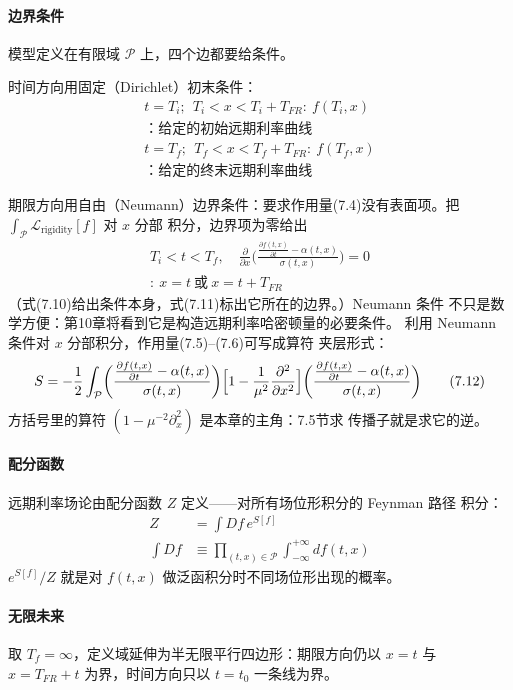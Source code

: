 \paragraph{边界条件}
模型定义在有限域 $\mathcal{P}$ 上，四个边都要给条件。

时间方向用固定（Dirichlet）初末条件：
\begin{gather*}
t=T_i;\ \ T_i<x<T_i+T_{FR}:\ f(T_i,x)\\
\text{：给定的初始远期利率曲线}
\tag{7.8}\\[2pt]
t=T_f;\ \ T_f<x<T_f+T_{FR}:\ f(T_f,x)\\
\text{：给定的终末远期利率曲线}
\tag{7.9}
\end{gather*}

期限方向用自由（Neumann）边界条件：要求作用量(7.4)没有表面项。把
$\int_{\mathcal{P}}\mathcal{L}_{\mathrm{rigidity}}[f]$ 对 $x$ 分部
积分，边界项为零给出
\begin{gather*}
T_i<t<T_f,\quad
\frac{\partial}{\partial x}\biggl(\frac{\frac{\partial f(t,x)}
{\partial t}-\alpha(t,x)}{\sigma(t,x)}\biggr)=0
\tag{7.10}\\
:\ x=t\ \text{或}\ x=t+T_{FR}
\tag{7.11}
\end{gather*}
（式(7.10)给出条件本身，式(7.11)标出它所在的边界。）Neumann 条件
不只是数学方便：第10章将看到它是构造远期利率哈密顿量的必要条件。
利用 Neumann 条件对 $x$ 分部积分，作用量(7.5)--(7.6)可写成算符
夹层形式：
\begin{equation*}
S=-\frac{1}{2}\int_{\mathcal{P}}
\biggl(\frac{\frac{\partial f(t,x)}{\partial t}-\alpha(t,x)}
{\sigma(t,x)}\biggr)
\Bigl[1-\frac{1}{\mu^{2}}\frac{\partial^{2}}{\partial x^{2}}\Bigr]
\biggl(\frac{\frac{\partial f(t,x)}{\partial t}-\alpha(t,x)}
{\sigma(t,x)}\biggr)
\tag{7.12}
\end{equation*}
方括号里的算符 $(1-\mu^{-2}\partial_x^2)$ 是本章的主角：7.5节求
传播子就是求它的逆。

\paragraph{配分函数}
远期利率场论由配分函数 $Z$ 定义——对所有场位形积分的 Feynman 路径
积分：
\begin{align*}
Z&=\int Df\,e^{S[f]}
\tag{7.13}\\
\int Df&\equiv\prod_{(t,x)\in\mathcal{P}}\int_{-\infty}^{+\infty}
df(t,x)
\tag{7.14}
\end{align*}
$e^{S[f]}/Z$ 就是对 $f(t,x)$ 做泛函积分时不同场位形出现的概率。

\paragraph{无限未来}
取 $T_f=\infty$，定义域延伸为半无限平行四边形：期限方向仍以
$x=t$ 与 $x=T_{FR}+t$ 为界，时间方向只以 $t=t_0$ 一条线为界。
